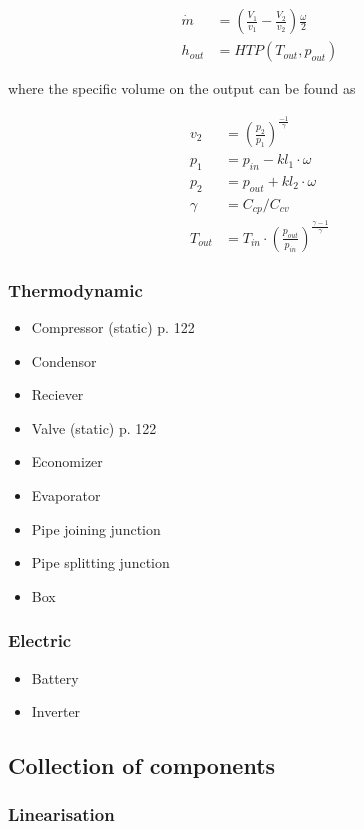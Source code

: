 \begin{align}
	\dot{m} &= \left(\frac{V_1}{v_1} - \frac{V_2}{v_2}\right) \frac{\omega}{2} \\
	h_{out} &= HTP(T_{out}, p_{out}) 
\end{align}

where the specific volume on the output can be found as 

\begin{align}
	v_2 &= \left(\frac{p_2}{p_1}\right)^{\frac{-1}{\gamma}} \\
	p_1 &= p_{in} - kl_1 \cdot \omega \\
	p_2 &= p_{out} + kl_2 \cdot \omega \\
	\gamma &= C_{cp}/C_{cv} \\
	T_{out} &= T_{in}\cdot \left(\frac{p_{out}}{p_{in}}\right)^{\frac{\gamma-1}{\gamma}}
\end{align}


\subsubsection{Thermodynamic}

\begin{itemize}
	\item Compressor (static) \cite{Sorensen2013} p. 122
	\item Condensor
	\item Reciever
	\item Valve (static) \cite{Sorensen2013} p. 122
	\item Economizer
	\item Evaporator
	\item Pipe joining junction
	\item Pipe splitting junction
	\item Box
\end{itemize}

\subsubsection{Electric}

\begin{itemize}
	\item Battery
	\item Inverter
\end{itemize}

\subsection{Collection of components}

\subsubsection{Linearisation}